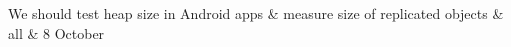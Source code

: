 \nextItem We should test heap size in Android apps \& measure size of replicated objects & all & 8 October